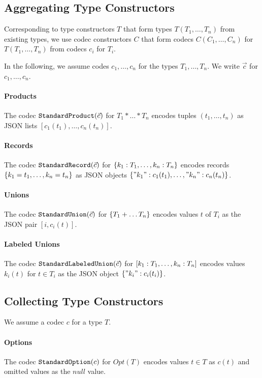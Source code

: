 \subsection{Aggregating Type Constructors}

Corresponding to type constructors $T$ that form types $T(T_1,\ldots,T_n)$ from existing types, we use codec constructors $C$ that form codecs $C(C_1,\ldots,C_n)$ for $T(T_1,\ldots,T_n)$ from codecs $c_i$ for $T_i$.

In the following, we assume codes $c_1,\ldots,c_n$ for the types $T_1,\ldots,T_n$.
We write $\vec{c}$ for $c_1,\ldots,c_n$.

\paragraph{Products}
The codec $\cn{StandardProduct}(\vec{c})$ for $T_1*\ldots*T_n$ encodes tuples $(t_1,\ldots,t_n)$ as JSON lists $[c_1(t_1),\ldots,c_n(t_n)]$.

\paragraph{Records}
The codec $\cn{StandardRecord}(\vec{c})$ for $\record{k_1:T_1,\ldots,k_n:T_n}$ encodes records $\record{k_1=t_1,\ldots,k_n=t_n}$ as JSON objects $\jobj{"k_1":c_1(t_1),\ldots,"k_n":c_n(t_n)}$.

\paragraph{Unions}
The codec $\cn{StandardUnion}(\vec{c})$ for $\record{T_1+\ldots T_n}$ encodes values $t$ of $T_i$ as the JSON pair $[i,c_i(t)]$.

\paragraph{Labeled Unions}
The codec $\cn{StandardLabeledUnion}(\vec{c})$ for $\union{k_1:T_1,\ldots,k_n:T_n}$ encodes values $k_i(t)$ for $t\in T_i$ as the JSON object $\jobj{"k_i":c_i(t_i)}$.

\subsection{Collecting Type Constructors}

We assume a codec $c$ for a type $T$.

\paragraph{Options}
The codec $\cn{StandardOption}(c)$ for $Opt(T)$ encodes values $t\in T$ as $c(t)$ and omitted values as the $null$ value.

